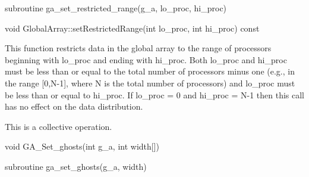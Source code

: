 \documentclass[12pt]{article}
\begin{document}
\begin{fapi}
\begin{fcode}
subroutine ga_set_restricted_range(g_a, lo_proc, hi_proc)
\end{fcode}
\begin{funcargs}
\end{funcargs}
\end{fapi}

\begin{cxxapi}
\begin{cxxcode}
void GlobalArray::setRestrictedRange(int lo_proc, int hi_proc) const
\end{cxxcode}
\begin{funcargs}
\end{funcargs}
\end{cxxapi}
\gcoll

\begin{desc}

  This function restricts data in the global array to the range of
  processors beginning with lo_proc and ending with hi_proc. Both
  lo_proc and hi_proc must be less than or equal to the total number
  of processors minus one (e.g., in the range [0,N-1], where N is the
  total number of processors) and lo_proc must be less than or equal
  to hi_proc. If lo_proc = 0 and hi_proc = N-1 then this call has no
  effect on the data distribution.

  This is a collective operation.

\end{desc}


\begin{capi}
\begin{ccode}
void GA_Set_ghosts(int g_a, int width[])
\end{ccode}
\begin{funcargs}
\end{funcargs}
\end{capi}

\begin{fapi}
\begin{fcode}
subroutine ga_set_ghosts(g_a, width)
\end{fcode}
\begin{funcargs}
\end{funcargs}
\end{fapi}
\end{document}
